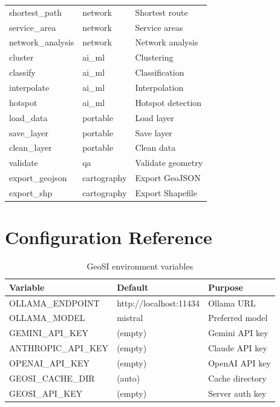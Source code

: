 \documentclass[12pt,a4paper]{report}
\begin{document}
\begin{longtable}{p{4cm} p{2.2cm} p{7cm}}
shortest\_path & network & Shortest route \\
service\_area & network & Service areas \\
network\_analysis & network & Network analysis \\

cluster & ai\_ml & Clustering \\
classify & ai\_ml & Classification \\
interpolate & ai\_ml & Interpolation \\
hotspot & ai\_ml & Hotspot detection \\

load\_data & portable & Load layer \\
save\_layer & portable & Save layer \\
clean\_layer & portable & Clean data \\

validate & qa & Validate geometry \\

export\_geojson & cartography & Export GeoJSON \\
export\_shp & cartography & Export Shapefile \\

\bottomrule

\end{longtable}

\chapter{Configuration Reference}

\begin{table}[ht]
\centering
\caption{GeoSI environment variables}
\begin{tabular}{lll}
\toprule
\textbf{Variable} & \textbf{Default} & \textbf{Purpose} \\
\midrule
OLLAMA\_ENDPOINT    & http://localhost:11434 & Ollama URL \\
OLLAMA\_MODEL       & mistral & Preferred model \\
GEMINI\_API\_KEY    & (empty) & Gemini API key \\
ANTHROPIC\_API\_KEY & (empty) & Claude API key \\
OPENAI\_API\_KEY    & (empty) & OpenAI API key \\
GEOSI\_CACHE\_DIR   & (auto)  & Cache directory \\
GEOSI\_API\_KEY     & (empty) & Server auth key \\
\bottomrule
\end{tabular}
\end{table}

\normalsize
\end{document}
